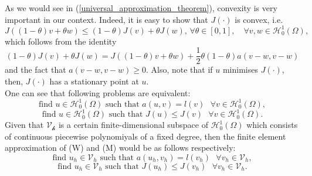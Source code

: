 As we would see in (\ref{universal_approximation_theorem}), convexity is very important in our context. Indeed, it is easy to show that $J(\cdot)$ is convex, i.e.
\begin{equation*}
J((1-\theta)v + \theta w) \leq (1-\theta) J(v) + \theta J(w) \text{,     }\forall \theta \in [0,1], \quad\forall v,w \in \mathscr{H}_{0}^{1}(\Omega),
\end{equation*}
which follows from the identity
\begin{equation*}
(1-\theta) J(v) + \theta J(w) = J((1-\theta)v + \theta w) + \frac{1}{2} \theta(1-\theta) a(v-w,v-w)
\end{equation*}
and the fact that $ a(v-w,v-w) \geq 0$. Also, note that if $u$ minimises $J(\cdot)$, then, $J(\cdot)$ has a stationary point at $u$.\\
One can see that following problems are equivalent:
\begin{equation*}
\tag{W}
\text{find }u\in  \mathscr{H}_{0}^{1}(\Omega) \text{ such that } a(u,v) = l(v) \text{    }\forall v \in \mathscr{H}_{0}^{1}(\Omega),
\end{equation*}
\begin{equation*}
\tag{M}
\text{find }u\in  \mathscr{H}_{0}^{1}(\Omega) \text{ such that } J(u) \leq J(v) \text{    }\forall v \in \mathscr{H}_{0}^{1}(\Omega).
\end{equation*}
Given that $\mathscr{V_h}$ is a certain finite-dimensional subspace of $\mathscr{H}_{0}^{1}(\Omega)$ which consists of continuous piecewise polynomiyals of a fixed degree, then the finite element approximation of (W) and (M) would be as follows respectively:
\begin{equation*}
\tag{$W_h$}
\text{find }u_h\in  \mathscr{V}_h \text{ such that } a(u_h,v_h) = l(v_h) \text{    }\forall v_h \in \mathscr{V}_h,
\end{equation*}
\begin{equation*}
\tag{$M_h$}
\text{find }u_h\in  \mathscr{V}_h \text{ such that } J(u_h) \leq J(v_h) \text{    }\forall v_h \in \mathscr{V}_h.
\end{equation*}

